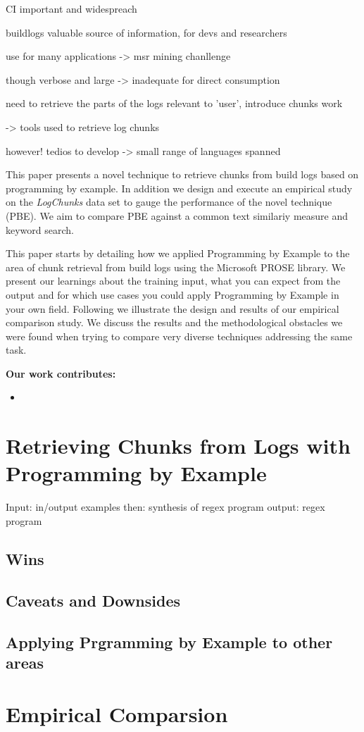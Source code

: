 CI important and widespreach

buildlogs valuable source of information, for devs and researchers

use for many applications -> msr mining chanllenge

though verbose and large -> inadequate for direct consumption

need to retrieve the parts of the logs relevant to 'user', introduce chunks work

-> tools used to retrieve log chunks

however! tedios to develop -> small range of languages spanned

This paper presents a novel technique to retrieve chunks from build logs based
on programming by example. In addition we design and execute an empirical study
on the \emph{LogChunks} data set
to gauge the performance of the novel technique (PBE).
We aim to compare PBE against a common text
similariy measure and keyword search. 

This paper starts by detailing how we applied Programming by Example to the
area of chunk retrieval from build logs using the Microsoft PROSE library.
We present our learnings about the
training input, what you can expect from the output and for which use cases you
could apply Programming by Example in your own field.
Following we illustrate the design and results of our empirical comparison study.
We discuss the results and the methodological obstacles we were found when
trying to compare very diverse techniques addressing the same task.

\textbf{Our work contributes:}
\begin{itemize}
  \item 
\end{itemize}


\section{Retrieving Chunks from Logs with Programming by Example}
Input: in/output examples
then: synthesis of regex program
output: regex program

\subsection{Wins}

\subsection{Caveats and Downsides}

\subsection{Applying Prgramming by Example to other areas}

\section{Empirical Comparsion}
